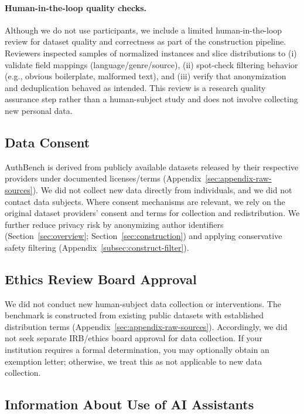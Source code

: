 \documentclass[11pt]{article}
\begin{document}
\paragraph{Human-in-the-loop quality checks.}
Although we do not use participants, we include a limited human-in-the-loop review for dataset quality and correctness as part of the construction pipeline.
Reviewers inspected samples of normalized instances and slice distributions to (i) validate field mappings (language/genre/source), (ii) spot-check filtering behavior (e.g., obvious boilerplate, malformed text), and (iii) verify that anonymization and deduplication behaved as intended.
This review is a research quality assurance step rather than a human-subject study and does not involve collecting new personal data.


\subsection{Data Consent}
\label{sec:checklist-d3}
AuthBench is derived from publicly available datasets released by their respective providers under documented licenses/terms (Appendix~\ref{sec:appendix-raw-sources}).
We did not collect new data directly from individuals, and we did not contact data subjects.
Where consent mechanisms are relevant, we rely on the original dataset providers’ consent and terms for collection and redistribution.
We further reduce privacy risk by anonymizing author identifiers (Section~\ref{sec:overview}; Section~\ref{sec:construction}) and applying conservative safety filtering (Appendix~\ref{subsec:construct-filter}).

\subsection{Ethics Review Board Approval}
\label{sec:checklist-d4}
We did not conduct new human-subject data collection or interventions.
The benchmark is constructed from existing public datasets with established distribution terms (Appendix~\ref{sec:appendix-raw-sources}).
Accordingly, we did not seek separate IRB/ethics board approval for data collection.
If your institution requires a formal determination, you may optionally obtain an exemption letter; otherwise, we treat this as not applicable to new data collection.

\subsection{Information About Use of AI Assistants}
\label{sec:checklist-e1}
\end{document}

